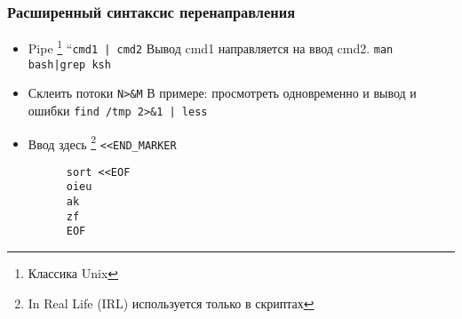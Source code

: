 \begin{frame}[fragile]
  \frametitle{Расширенный синтаксис перенаправления}
  
  \begin{itemize}
    \item \alert{Pipe} \footnote{Классика Unix} \textquotedbl``\verb+cmd1 | cmd2+ \textquotedbl \newline
      Вывод cmd1 направляется на ввод cmd2. \newline
      \verb+man bash|grep ksh+ \pause
    \item \alert{Склеить потоки} \textquotedbl \verb+N>&M+ \textquotedbl \newline
      В примере: просмотреть одновременно и вывод и ошибки \newline
      \verb+find /tmp 2>&1 | less+ \pause
    \item \alert{\textquotedbl Ввод здесь \textquotedbl}\footnote{In Real Life (IRL) используется только в скриптах} \textquotedbl \verb+<<END_MARKER+ \textquotedbl \newline
      \begin{verbatim}
      sort <<EOF
      oieu
      ak
      zf
      EOF
      \end{verbatim}
  \end{itemize}
\end{frame}

